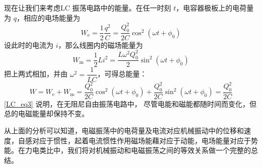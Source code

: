 现在让我们来考虑LC 振荡电路中的能量。在任一时刻 $t$，电容器极板上的电荷量为 $q$，相应的电场能量为
\begin{equation}
W_{\mathrm e}=\frac{1}{2} \frac{q^{2}}{C}=\frac{Q_{0}^{2}}{2 C} \cos ^{2}\left(\omega t+\phi_{0}\right)
\end{equation}
设此时的电流为 $i$，那么线圈内的磁场能量为
\begin{equation}
W_{\mathrm{m}}=\frac{1}{2} L i^{2}=\frac{L \omega^{2} Q_{0}^{2}}{2} \sin ^{2}\left(\omega t+\phi_{0}\right)
\end{equation}
把上两式相加，并由 $\omega^{2}=\dfrac{1}{L C}$，可得总能量：
\begin{equation} \label{LC_eq3}
W=W_{\mathrm{e}}+W_{\mathrm{m}}=\frac{Q_{0}^{2}}{2 C} \cos ^{2}\left(\omega t+\phi_{0}\right)+\frac{Q_{0}^{2}}{2 C} \sin ^{2}\left(\omega t+\phi_{0}\right)=\frac{Q_{0}^{2}}{2 C}
\end{equation}
\autoref{LC_eq3} 说明，在无阻尼自由振荡电路中， 尽管电能和磁能都随时间而变化，但总的电磁能量却保持不变。

从上面的分析可以知道，电磁振荡中的电荷量及电流对应机械振动中的位移和速度，自感对应于惯性，起着电流惯性作用磁场能藉对应于动能，电场能量对应于势能。在力电类比中，我们将对机械振动和电磁振荡之间的等效关系做一个完整的总结。
